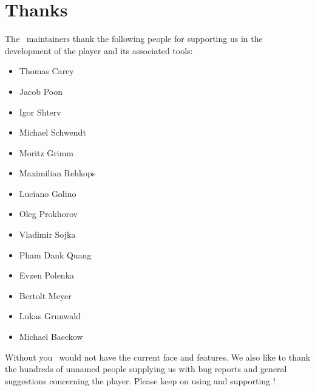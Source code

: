 %
%

\chapter{Thanks}
The \cp\ maintainers thank the following people for supporting us in the
development of the player and its associated tools:
\begin{itemize}
\item Thomas Carey
\item Jacob Poon
\item Igor Shterv
\item Michael Schwendt
\item Moritz Grimm
\item Maximilian Rehkops
\item Luciano Golino
\item Oleg Prokhorov
\item Vladimir Sojka
\item Pham Dank Quang
\item Evzen Polenka
\item Bertolt Meyer
\item Lukas Grunwald
\item Michael Baeckow
\end{itemize}
Without you \cp\ would not have the current face and features. We also like to
thank the hundreds of unnamed people supplying us with bug reports and general
suggestions concerning the player. Please keep on using and supporting \cp!
